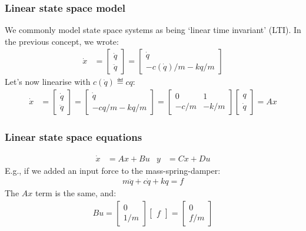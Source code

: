 \documentclass{beamer-control}
\begin{document}
\begin{frame}
\frametitle{Linear state space model}
We commonly model state space systems as being `linear time invariant' (LTI).
In the previous concept, we wrote:
\begin{align}
\dot x &= \begin{bmatrix}\dot q\\\ddot q\end{bmatrix} = \begin{bmatrix}\dot q\\- c(\dot q)/m - kq/m\end{bmatrix}
\end{align}
Let's now linearise with $c(\dot q) \eqdef c q$:
\begin{align}
\dot x &= \begin{bmatrix}\dot q\\\ddot q\end{bmatrix} = \begin{bmatrix}\dot q\\- cq/m - kq/m\end{bmatrix} 
              = \begin{bmatrix}0 & 1\\- c/m & - k/m\end{bmatrix}\begin{bmatrix} q\\\dot q\end{bmatrix} = Ax
\end{align}
\end{frame}

\begin{frame}
\frametitle{Linear state space equations}
\begin{align}
\dot x &= Ax + Bu & y &= Cx + Du
\end{align}
E.g., if we added an input force to the mass-spring-damper:
\begin{align}
m\ddot q + c\dot q + kq = f
\end{align}
The $Ax$ term is the same, and:
\begin{align}
Bu = \begin{bmatrix} 0\\ 1/m\end{bmatrix}\begin{bmatrix} f\end{bmatrix} = \begin{bmatrix} 0\\ f/m\end{bmatrix}
\end{align}
\end{frame}
\end{document}
